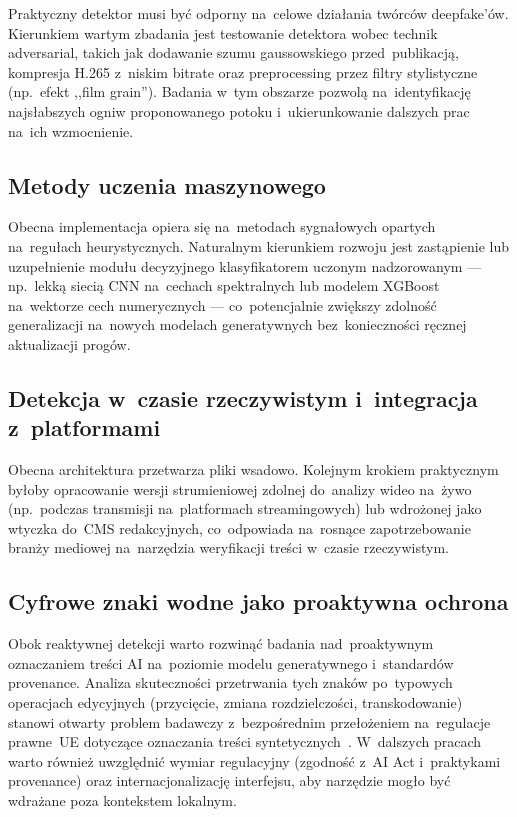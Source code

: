 Praktyczny detektor musi by\'{c} odporny na~celowe dzia\l{}ania tw\'{o}rc\'{o}w deepfake'\'{o}w.
Kierunkiem wartym zbadania jest testowanie detektora wobec technik adversarial,
takich jak dodawanie szumu gaussowskiego przed~publikacj\k{a}, kompresja
H.265 z~niskim bitrate oraz preprocessing przez filtry stylistyczne
(np.\ efekt ,,film grain'').
Badania w~tym obszarze pozwol\k{a} na~identyfikacj\k{e} najs\l{}abszych ogniw
proponowanego potoku i~ukierunkowanie dalszych prac na~ich wzmocnienie.

\subsection{Metody uczenia maszynowego}

Obecna implementacja opiera si\k{e} na~metodach sygna\l{}owych opartych na~regu\l{}ach
heurystycznych. Naturalnym kierunkiem rozwoju jest zast\k{a}pienie lub uzupe\l{}nienie
modu\l{}u decyzyjnego klasyfikatorem uczonym nadzorowanym ---
np.\ lekk\k{a} sieci\k{a} CNN na~cechach spektralnych lub modelem XGBoost
na~wektorze cech numerycznych --- co~potencjalnie zwi\k{e}kszy zdolno\'{s}\'{c}
generalizacji na~nowych modelach generatywnych bez~konieczno\'{s}ci r\k{e}cznej
aktualizacji prog\'{o}w.

\subsection{Detekcja w~czasie rzeczywistym i~integracja z~platformami}

Obecna architektura przetwarza pliki wsadowo. Kolejnym krokiem praktycznym
by\l{}oby opracowanie wersji strumieniowej zdolnej do~analizy wideo na~\.{z}ywo
(np.\ podczas transmisji na~platformach streamingowych) lub wdro\.{z}onej jako
wtyczka do~CMS redakcyjnych, co~odpowiada na~rosn\k{a}ce zapotrzebowanie
bran\.{z}y mediowej na~narz\k{e}dzia weryfikacji tre\'{s}ci w~czasie rzeczywistym.

\subsection{Cyfrowe znaki wodne jako proaktywna ochrona}

Obok reaktywnej detekcji warto rozwin\k{a}\'{c} badania nad~proaktywnym
oznaczaniem tre\'{s}ci AI na~poziomie modelu generatywnego i~standardów provenance.
Analiza skuteczno\'{s}ci przetrwania tych znak\'{o}w po~typowych operacjach edycyjnych
(przyci\k{e}cie, zmiana rozdzielczo\'{s}ci, transkodowanie) stanowi otwarty
problem badawczy z~bezpo\'{s}rednim prze\l{}o\.{z}eniem na~regulacje prawne~UE
dotycz\k{a}ce oznaczania tre\'{s}ci syntetycznych~\cite{EUAIAct2024}.
W~dalszych pracach warto równie\.z{} uwzgl\k{e}dni\'{c} wymiar regulacyjny
(zgodno\'{s}\'{c} z~AI Act i~praktykami provenance) oraz internacjonalizacj\k{e}
interfejsu, aby narz\k{e}dzie mog\l{}o by\'{c} wdra\.{z}ane poza kontekstem lokalnym.
